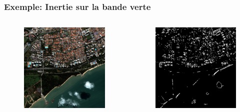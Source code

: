 \documentclass[compress]{beamer}
\begin{document}
\begin{frame}
\frametitle{Exemple: Inertie sur la bande verte}
\begin{columns}
\begin{column}{0.5\textwidth}
\begin{figure}[]
  \includegraphics[width=1.0\textwidth]{radio2-extract-3b.jpg}
\end{figure}
\end{column}
\begin{column}{0.5\textwidth}
\begin{figure}[]
  \includegraphics[width=1.0\textwidth]{Texture-Inertia-R2-2-O1-1-C1.jpg}
\end{figure}
\end{column}
\end{columns}
\end{frame}
\end{document}
